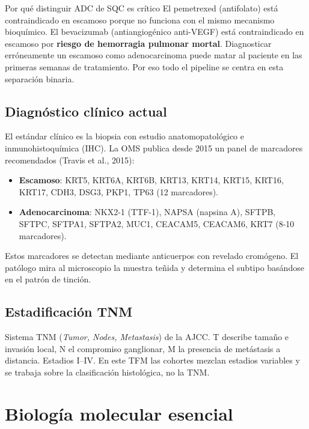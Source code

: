 \documentclass[11pt, a4paper]{article}
\begin{document}
\begin{concepto}{Por qu\'e distinguir ADC de SQC es cr\'itico}
El pemetrexed (antifolato) est\'a contraindicado en escamoso porque no
funciona con el mismo mecanismo bioqu\'imico. El bevacizumab
(antiangiog\'enico anti-VEGF) est\'a contraindicado en escamoso por
\textbf{riesgo de hemorragia pulmonar mortal}. Diagnosticar
err\'oneamente un escamoso como adenocarcinoma puede matar al paciente
en las primeras semanas de tratamiento. Por eso todo el pipeline se
centra en esta separaci\'on binaria.
\end{concepto}

\subsection{Diagn\'ostico cl\'inico actual}

El est\'andar cl\'inico es la biopsia con estudio anatomopatol\'ogico e
inmunohistoqu\'imica (IHC). La OMS publica desde 2015 un panel de
marcadores recomendados (Travis et al., 2015):

\begin{itemize}[leftmargin=1.2em]
  \item \textbf{Escamoso}: KRT5, KRT6A, KRT6B, KRT13, KRT14, KRT15, KRT16,
  KRT17, CDH3, DSG3, PKP1, TP63 (12 marcadores).
  \item \textbf{Adenocarcinoma}: NKX2-1 (TTF-1), NAPSA (napsina A), SFTPB,
  SFTPC, SFTPA1, SFTPA2, MUC1, CEACAM5, CEACAM6, KRT7 (8-10 marcadores).
\end{itemize}

Estos marcadores se detectan mediante anticuerpos con revelado
crom\'ogeno. El pat\'ologo mira al microscopio la muestra te\~nida y
determina el subtipo bas\'andose en el patr\'on de tinci\'on.

\subsection{Estadificaci\'on TNM}

Sistema TNM (\emph{Tumor, Nodes, Metastasis}) de la AJCC. T describe
tama\~no e invasi\'on local, N el compromiso ganglionar, M la presencia
de met\'astasis a distancia. Estadios I--IV. En este TFM las cohortes
mezclan estadios variables y se trabaja sobre la clasificaci\'on
histol\'ogica, no la TNM.

\section{Biolog\'ia molecular esencial}
\end{document}
